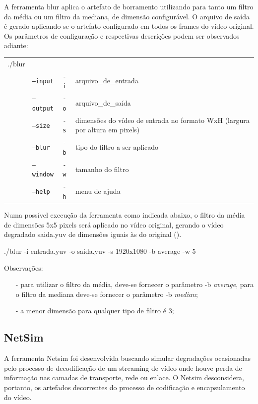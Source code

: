 A ferramenta blur aplica o artefato de borramento utilizando para tanto um filtro da média ou um filtro da mediana, de dimensão configurável. O arquivo de saída é gerado aplicando-se o artefato configurado em todos os frames do vídeo original. Os parâmetros de configuração e respectivas descrições podem ser observados adiante:

\begin{table}[!h]
	\begin{tabular}{llll}
	./blur & & \\ 
	& \texttt{--input} & \texttt{-i}  & arquivo\_de\_entrada \\
	& \texttt{--output} & \texttt{-o}  & arquivo\_de\_saída \\
	& \texttt{--size} & \texttt{-s}  & dimensões do vídeo de entrada no formato WxH (largura por altura em pixels) \\
	& \texttt{--blur} & \texttt{-b}  & tipo do filtro a ser aplicado \\
	& \texttt{--window} & \texttt{-w}  & tamanho do filtro \\
	& \texttt{--help} & \texttt{-h}  & menu de ajuda \\
	\end{tabular}
\end{table}

Numa possível execução da ferramenta como indicada abaixo, o filtro da média de dimensões 5x5 pixels será aplicado no vídeo original, gerando o vídeo degradado saida.yuv de dimensões iguais às do original ().

./blur -i entrada.yuv -o saida.yuv -s 1920x1080 -b average -w 5

Observações:
\begin{itemize}
    \item[-] para utilizar o filtro da média, deve-se fornecer o parâmetro -b \emph{average}, para o filtro da mediana deve-se fornecer o parâmetro -b \emph{median};
    \item[-] a menor dimensão para qualquer tipo de filtro é 3;
\end{itemize}

\subsection{NetSim}

A ferramenta Netsim foi desenvolvida buscando simular degradações ocasionadas pelo processo de decodificação de um streaming de vídeo onde houve perda de informação nas camadas de transporte, rede ou enlace. O Netsim desconsidera, portanto, os artefados decorrentes do processo de codificação e encapsulamento do vídeo.

